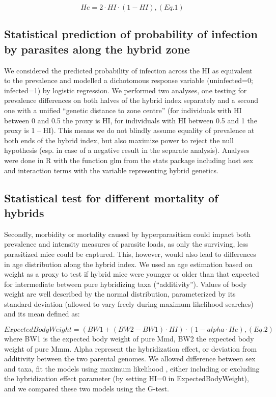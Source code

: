 \[He=2 · HI · (1 − HI) ,           (Eq. 1)\]

\subsection{Statistical prediction of probability of infection by parasites along the hybrid zone}
We considered the predicted probability of infection across the HI as equivalent to the prevalence and modelled a dichotomous response variable (uninfected=0; infected=1) by logistic regression. We performed two analyses, one testing for prevalence differences on both halves of the hybrid index separately and a second one with a unified “genetic distance to zone centre” (for individuals with HI between 0 and 0.5 the proxy is HI, for individuals with HI between 0.5 and 1 the proxy is 1 – HI). This means we do not blindly assume equality of prevalence at both ends of the hybrid index, but also maximize power to reject the null hypothesis (esp. in case of a negative result in the separate analysis). Analyses were done in R with the function glm from the stats package \citep{R_2010} including host sex and interaction terms with the variable representing hybrid genetics.

\subsection{Statistical test for different mortality of hybrids}
Secondly, morbidity or mortality caused by hyperparasitism could impact both prevalence and intensity measures of parasite loads, as only the surviving, less parasitized mice could be captured. This, however, would also lead to differences in age distribution along the hybrid index. We used an age estimation based on weight \parencite[as in][]{behnke_aspiculuris_1976} as a proxy to test if hybrid mice were younger or older than that expected for intermediate between pure hybridizing taxa (“additivity”). Values of body weight are well described by the normal distribution, parameterized by its standard deviation (allowed to vary freely during maximum likelihood searches) and its mean defined as:

\[ExpectedBodyWeight=(BW1 + (BW2 − BW1) · HI) · (1 − alpha · He) ,     (Eq. 2)\]
where BW1 is the expected body weight of pure Mmd, BW2 the expected body weight of pure Mmm. Alpha represent the hybridization effect, or deviation from additivity between the two parental genomes. We allowed difference between sex and taxa, fit the models using maximum likelihood \parencite[using the R package mle2;][]{bolker_bbmle_2017}, either including or excluding the hybridization effect parameter (by setting HI=0 in ExpectedBodyWeight), and we compared these two models using the G-test. 

